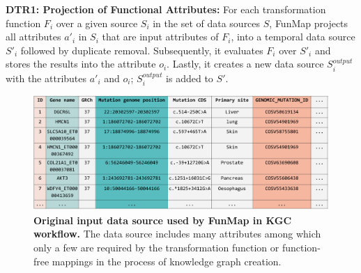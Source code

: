 \noindent\textbf{DTR1: Projection of Functional Attributes:}
For each transformation function $F_i$ over a given source $S_i$ in the set of data sources $S$, FunMap projects all attributes $a'_i$ in $S_i$ that are input attributes of $F_i$, into a temporal data source $S'_i$ followed by duplicate removal. Subsequently, it evaluates $F_i$ over $S'_i$ and stores the results into the attribute $o_i$. Lastly, it creates a new data source $S_{i}^{output}$ with the attributes $a'_i$ and $o_i$; $S_{i}^{output}$ is added to $S'$. 
\begin{figure}[t!]
\includegraphics[width=\textwidth]{figures/OriginalDatasource.png}
\caption[Original input data source used by FunMap in KGC workflow]{\textbf{Original input data source used by FunMap in KGC workflow.} The data source includes many attributes among which only a few are required by the transformation function or function-free mappings in the process of knowledge graph creation.} 
\label{fig:OriginalDatasource}
\end{figure}
